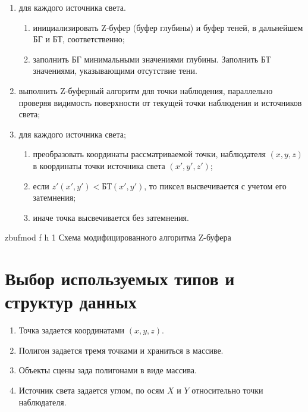 \begin{enumerate}
	\item для каждого источника света.
	
	\begin{enumerate}[label=\arabic{enumi}.\arabic*]
		\item инициализировать Z-буфер (буфер глубины)  и буфер теней, в дальнейшем БГ и БТ, соответственно;
		\item заполнить БГ минимальными значениями глубины.
		Заполнить БТ значениями, указывающими отсутствие тени.
	\end{enumerate}
	
	\item выполнить Z-буферный алгоритм для точки наблюдения, параллельно проверяя видимость поверхности от текущей точки наблюдения и источников света;
	\item для каждого источника света;
	
	\begin{enumerate}[label=\arabic{enumi}.\arabic*]
		\item преобразовать координаты рассматриваемой точки, наблюдателя $(x, y, z)$ в координаты точки источника света $(x', y', z')$;
		\item если $z'(x', y') < БТ(x', y')$, то пиксел высвечивается с учетом его затемнения;
		\item  иначе точка высвечивается без затемнения.
	\end{enumerate}
	
	
\end{enumerate}
\fi

	{zbufmod} %
	{f} %
	{h} %
	{1\textwidth} %
	{Схема модифицированного алгоритма Z-буфера} %

\clearpage


\section{Выбор используемых типов и структур данных}

\begin{enumerate}
	\item Точка задается координатами $(x, y, z)$.
	\item Полигон задается тремя точками и храниться в массиве.
	\item Объекты сцены зада полигонами в виде массива.
	\item Источник света задается углом, по осям $X$ и $Y$ относительно точки наблюдателя. 
\end{enumerate}

